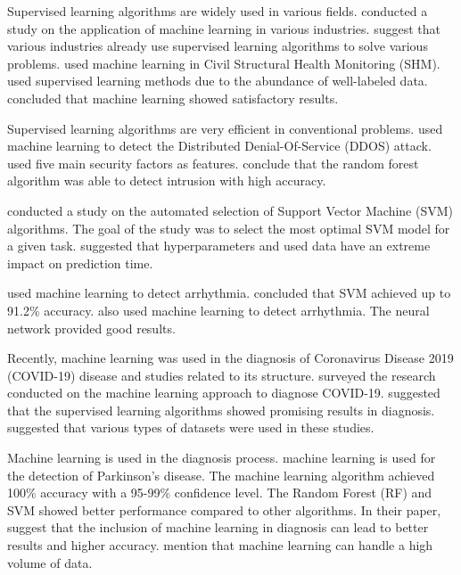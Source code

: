 \documentclass[a4paper,fleqn]{cas-dc}
\begin{document}
Supervised learning algorithms are widely used in various fields. \cite*{ref_paper_14} conducted a study on the application of machine learning in various industries. \citeauthor{ref_paper_14} suggest that various industries already use supervised learning algorithms to solve various problems. \cite*{ref_paper_6} used machine learning in Civil Structural Health Monitoring (SHM). \citeauthor{ref_paper_6} used supervised learning methods due to the abundance of well-labeled data. \citeauthor{ref_paper_6} concluded that machine learning showed satisfactory results.

Supervised learning algorithms are very efficient in conventional problems. \cite*{ref_paper_9} used machine learning to detect the Distributed Denial-Of-Service (DDOS) attack. \citeauthor{ref_paper_9} used five main security factors as features. \citeauthor{ref_paper_9} conclude that the random forest algorithm was able to detect intrusion with high accuracy.

\cite*{ref_paper_2} conducted a study on the automated selection of Support Vector Machine (SVM) algorithms. The goal of the study was to select the most optimal SVM model for a given task. \citeauthor{ref_paper_2} suggested that hyperparameters and used data have an extreme impact on prediction time.

\cite*{ref_paper_38} used machine learning to detect arrhythmia. \citeauthor{ref_paper_38} concluded that SVM achieved up to 91.2\% accuracy. \cite*{ref_paper_16} also used machine learning to detect arrhythmia. The neural network provided good results.

Recently, machine learning was used in the diagnosis of Coronavirus Disease 2019 (COVID-19) disease and studies related to its structure. \cite*{ref_paper_20} surveyed the research conducted on the machine learning approach to diagnose COVID-19. \citeauthor{ref_paper_20} suggested that the supervised learning algorithms showed promising results in diagnosis. \citeauthor{ref_paper_20} suggested that various types of datasets were used in these studies.

Machine learning is used in the diagnosis process. \cite*{ref_paper_34} machine learning is used for the detection of Parkinson's disease. The machine learning algorithm achieved 100\% accuracy with a 95-99\% confidence level. The Random Forest (RF) and SVM showed better performance compared to other algorithms. In their paper, \cite*{ref_paper_15} suggest that the inclusion of machine learning in diagnosis can lead to better results and higher accuracy. \citeauthor{ref_paper_15} mention that machine learning can handle a high volume of data.
\end{document}
